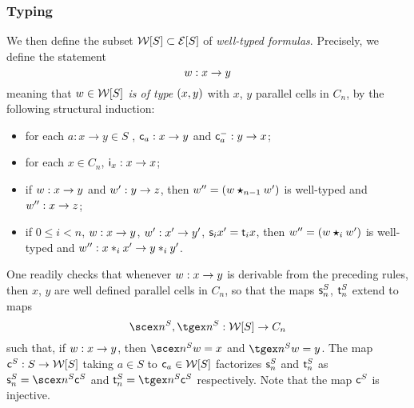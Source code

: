 \subsubsection{Typing}\label{ssubsec:types}
We then define the
subset  $\mathcal{W}[S]\subset\mathcal{E}[S]$ of {\em well-typed formulas}.
Precisely, we define the statement
\[w:x\to y\]
meaning that {\em $w\in\mathcal{W}[S]$ is of type $(x,y)$} with $x$, $y$ parallel
cells in $C_n$, by the following structural induction:
\begin{itemize}
\item for each $a:x\to y\in S$ ,
  $\mathsf{c}_{a}:x\to y$
  and $\mathsf{c}^{-}_{a}:y\to x$;
\item for  each $x\in C_n$, $\mathsf{i}_{x}:x\to x$;
 \item if $w:x\to y$ and $w':y\to z$, then $w''=(w\bm{\star}_{n-1}w')$ is
   well-typed and $w'':x\to z$;
 \item if $0\leq i<n$, $w:x\to y$, $w':x'\to y'$, $\mathsf{s}_{i}{x'}=\mathsf{t}_{i}{x}$, then $w''=(w\bm{\star}_{i} w')$ is well-typed and
   $w'':x\ast_{i} x'\to y\ast_{i} y'$. 
 \end{itemize}
 One readily checks that whenever $w:x\to y$ is derivable from the
 preceding rules, then $x$, $y$ are well defined parallel cells in
 $C_n$, so that the maps $\mathsf{s}_{n}^S$, $\mathsf{t}_{n}^S$ extend to maps
 \[\scex n^S, \tgex n^S :\wtx S\to C_n\]
 such that, if $w:x\to y$,  then $\scex n^S w=x$ and $\tgex n^S
 w=y$. The map $\mathsf{c}^{S}:S\to \mathcal{W}[S]$  taking
 $a\in S$ to $\mathsf{c}_{a}\in\mathcal{W}[S]$ factorizes $\mathsf{s}_{n}^S$ and $\mathsf{t}_{n}^S$
 as $\sce n^S=\scex n^S \finc S$ and $\tge n^S=\tgex n^S\finc S$
 respectively. Note that the map $\mathsf{c}^{S}$ is injective. 
 
